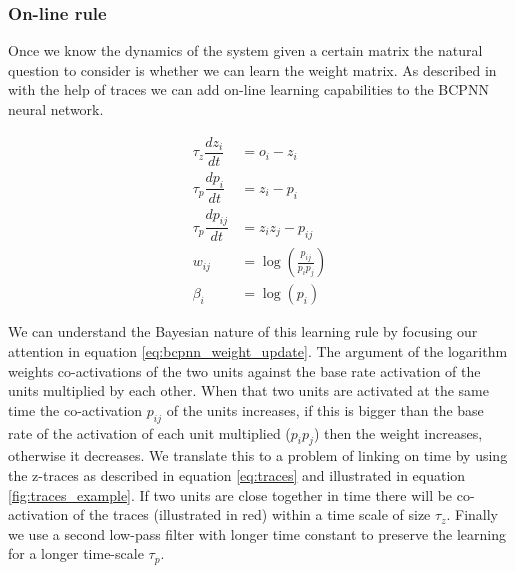 \documentclass[10pt,a4paper]{article}
\begin{document}
\subsubsection{On-line rule}
Once we know the dynamics of the system given a certain matrix the natural question to consider is whether we can learn the weight matrix. As described in \cite{sandberg2002bayesian} with the help of traces we can add on-line learning capabilities to the BCPNN neural network. 

\begin{align}
\tau_z \dfrac{dz_i}{dt} &= o_i - z_i \label{eq:traces}\\
\tau_p \dfrac{dp_i}{dt} &= z_i - p_i  \label{eq:traces_probability} \\  
\tau_p \dfrac{dp_{ij}}{dt} &= z_i z_j - p_{ij} \\
w_{ij} &= \log(\frac{p_{ij}}{p_i p_j}) \label{eq:bcpnn_weight_update} \\
\beta_i &= \log(p_i) 
\end{align}

We can understand the Bayesian nature of this learning rule by focusing our attention in equation \ref{eq:bcpnn_weight_update}. The argument of the logarithm weights co-activations of the two units against the base rate activation of the units multiplied by each other. When that two units are activated at the same time the co-activation $p_{ij}$ of the units increases, if this is bigger than the  base rate of the activation of each unit multiplied ($p_i p_j$) then the weight increases, otherwise it decreases. We translate this to a problem of linking on time by using the z-traces as described in equation \ref{eq:traces} and illustrated in equation \ref{fig:traces_example}. If two units are close together in time there will be co-activation of the traces (illustrated in red) within a time scale of size $\tau_z$. Finally  we use a second low-pass filter  with longer time constant to preserve the learning for a longer time-scale $\tau_p$. 
\end{document}

